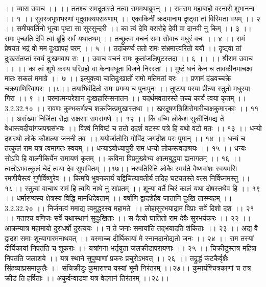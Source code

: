 ।। व्यास उवाच ।। ।।
ततश्च रामदूतास्ते नत्वा राममथाब्रुवन् ।।
रामराम महाबाहो वरनारी शुभानना ।। १ ।।
सुवस्त्रभूषाभरणां मृदुवाक्यपरायणाम् ।।
एकाकिनीं क्रदमानाम दृष्ट्वा तां विस्मिता वयम् ।। २ ।।
समीपवर्तिनो भूत्वा पृष्टा सा सुरसुन्दरी ।।
का त्वं देवि वरारोहे देवी वा दानवी नु किम् ।। ३ ।।
रामः पृच्छति देवि त्वां ब्रूहि सर्वं यथातथम् ।।
तच्छ्रुत्वा वचनं रामा सोवाच मधुरं वचः ।। ४ ।।
रामं प्रेषयत भद्रं वो मम दुःखापहं परम् ।। ५ ।।
तदाकर्ण्य ततो रामः संभ्रमात्त्वरितो ययौ ।।
दृष्ट्वा तां दुःखसंतप्तां स्वयं दुःखमवाप सः ।।
उवाच वचनं रामः कृतांजलिपुटस्तदा ।। ६ ।।
।। श्रीराम उवाच ।। ।।
का त्वं शुभे कस्य परिग्रहो वा केनावधूता विजने निरस्ता ।।
मुष्टं धनं केन च तावकीनमाचक्ष्व मातः सकलं ममाग्रे ।। ७ ।।
इत्युक्त्वा चातिदुःखार्तो रामो मतिमतां वरः ।।
प्रणामं दंडवच्चक्रे चक्रपाणिरिवापरः ।।८।।
तयाभिवंदितो रामः प्रगम्य च पुनःपुनः ।।
तुष्टया परया प्रीत्या स्तुतो मधुरया गिरा ।। ९ ।।
परमात्मन्परेशान दुःखहारिन्सनातन ।।
यदर्थमवतारस्ते तच्च कार्यं त्वया कृतम् ।। 3.2.32.१० ।।
रावणः कुम्भकर्णश्च शक्रजित्प्रमुखास्तथा ।।
खरदूषणत्रिशिरोमारीचाक्षकुमारकाः ।। ११ ।।
असंख्या निर्जिता रौद्रा राक्षसाः समरांगणे ।। १२ ।।
किं वच्मि लोकेश सुकीर्त्तिमद्य ते वेधास्त्वदीयांगजपद्मसंभवः ।।
विश्वं निविष्टं च ततो ददर्श वटस्य पत्रे हि यथो वटो मतः ।। १३ ।।
धन्यो दशरथो लोके कौशल्या जननी तव ।।
ययोर्जातोसि गोविंद जगदीश परः पुमान् ।। १४ ।।
धन्यं च तत्कुलं राम यत्र त्वमागतः स्वयम् ।।
धन्याऽयोध्यापुरी राम धन्यो लोकस्त्वदाश्रयः ।। १५ ।।
धन्यः सोऽपि हि वाल्मीकिर्येन रामायणं कृतम् ।।
कविना विप्रमुख्येभ्य आत्मबुद्ध्या ह्यनागतम् ।। १६ ।।
त्वत्तोऽभवत्कुलं चेदं त्वया देव सुपावितम् ।।१७।।
नरपतिरिति लोकैः स्मर्यते वैष्णवांशः स्वयमसि रमणीयैस्त्वं गुणैर्विष्णुरेव ।।
किमपि भुवनकार्यं यद्विचिंत्यावतीर्य तदिह घटयतस्ते वत्स निर्विघ्नमस्तु ।।१८।।
स्तुत्वा वाचाथ रामं हि त्वयि नाथे नु सांप्रतम् ।।
शून्या वर्ते चिरं कालं यथा दोषस्तथैव हि ।। १९ ।।
धर्मारण्यस्य क्षेत्रस्य विद्धि मामधिदेवताम् ।।
वर्षाणि द्वादशेहैव जातानि दुःखि तास्म्यहम् ।। 3.2.32.२० ।।
निर्जनत्वं ममाद्य त्वमुद्धरस्व महामते ।।
लोहासुरभयाद्राम विप्राः सर्वे दिशो दश ।। २१ ।।
गताश्च वणिजः सर्वे यथास्थानं सुदुःखिताः ।।
स दैत्यो घातितो राम देवैः सुरभयंकरः ।। २२ ।।
आक्रम्यात्र महामायो दुराधर्षो दुरत्ययः ।।
न ते जनाः समायांति तद्भयादति शंकिताः ।। २३ ।।
अद्य वै द्वादश समाः शून्यागारमनाथवत् ।।
यस्माच्च दीर्घिकायां मे स्नानदानोद्यतो जनः ।। २४ ।।
राम तस्यां दीर्घिकायां निपतंति च शूकराः ।।
यत्रांगना भर्तृयुता जलक्रीडापरायणाः ।। २५ ।।
चिक्रीडुस्तत्र महिषा निपतंति जलाशये ।।
यत्र स्थाने सुपुष्पाणां प्रकरः प्रचुरोऽभवत् ।। २६ ।।
तद्रुद्धं कंटकैर्वृक्षैः सिंहव्याघ्रसमाकुलैः ।।
संचिक्रीडुः कुमाराश्च यस्यां भूमौ निरंतरम् ।।२७।।
कुमार्यश्चित्रकाणां च तत्र क्रीडं ति हर्षिताः ।।
अकुर्वन्वाडवा यत्र वेदगानं तिरंतरम् ।।२८।।
